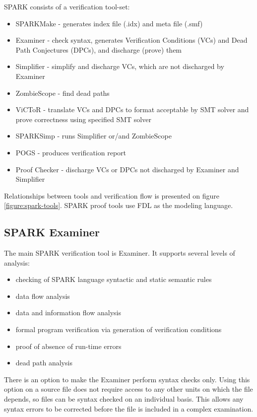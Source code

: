 SPARK consists of a verification tool-set:
\begin{itemize}
	\item SPARKMake - generates index file (.idx) and meta file (.smf)
	\item Examiner - check syntax, generates Verification Conditions (VCs) and Dead Path Conjectures (DPCs), and discharge (prove) them
	\item Simplifier - simplify and discharge VCs, which are not discharged by Examiner
	\item ZombieScope - find dead paths
	\item ViCToR - translate VCs and DPCs to format acceptable by SMT solver and prove correctness using specified SMT solver
	\item SPARKSimp - runs Simplifier or/and ZombieScope
	\item POGS - produces verification report
	\item Proof Checker - discharge VCs or DPCs not discharged by Examiner and Simplifier
\end{itemize}

Relationships between tools and verification flow is presented on figure \ref{figure:spark-tools}. SPARK proof tools use FDL as the modeling language. 



\subsection{SPARK Examiner}
\label{background:sparkverification:examiner}

The main SPARK verification tool is Examiner. It supports several levels of analysis:
\begin{itemize}
	\item checking of SPARK language syntactic and static semantic rules
	\item data flow analysis
	\item data and information flow analysis
	\item formal program verification via generation of verification conditions
	\item proof of absence of run-time errors
	\item dead path analysis
\end{itemize}

There is an option to make the Examiner perform syntax checks only. Using this option on a source file does not require access to any other units on which the file depends, so files can be syntax checked on an individual basis. This allows any syntax errors to be corrected before the file is included in a complex examination. \cite{Examiner:Online}

